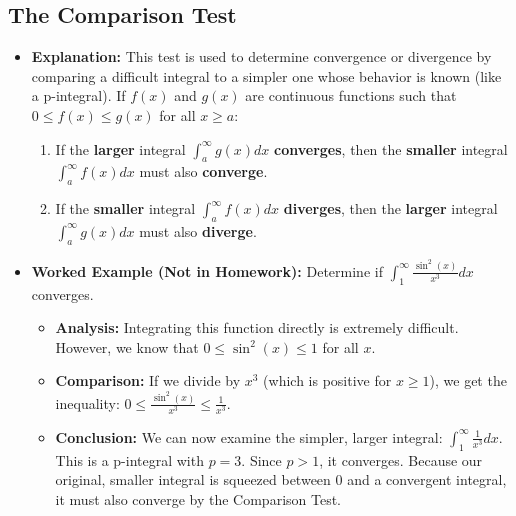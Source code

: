 \documentclass{article}
\begin{document}
\subsection{The Comparison Test}
\begin{itemize}
    \item \textbf{Explanation:} This test is used to determine convergence or divergence by comparing a difficult integral to a simpler one whose behavior is known (like a p-integral). If $f(x)$ and $g(x)$ are continuous functions such that $0 \le f(x) \le g(x)$ for all $x \ge a$:
    \begin{enumerate}
        \item If the \textbf{larger} integral $\int_a^\infty g(x) dx$ \textbf{converges}, then the \textbf{smaller} integral $\int_a^\infty f(x) dx$ must also \textbf{converge}.
        \item If the \textbf{smaller} integral $\int_a^\infty f(x) dx$ \textbf{diverges}, then the \textbf{larger} integral $\int_a^\infty g(x) dx$ must also \textbf{diverge}.
    \end{enumerate}
    \item \textbf{Worked Example (Not in Homework):} Determine if $\int_1^\infty \frac{\sin^2(x)}{x^3} dx$ converges.
    \begin{itemize}
        \item \textbf{Analysis:} Integrating this function directly is extremely difficult. However, we know that $0 \le \sin^2(x) \le 1$ for all $x$.
        \item \textbf{Comparison:} If we divide by $x^3$ (which is positive for $x \ge 1$), we get the inequality: $0 \le \frac{\sin^2(x)}{x^3} \le \frac{1}{x^3}$.
        \item \textbf{Conclusion:} We can now examine the simpler, larger integral: $\int_1^\infty \frac{1}{x^3} dx$. This is a p-integral with $p=3$. Since $p>1$, it converges. Because our original, smaller integral is squeezed between 0 and a convergent integral, it must also converge by the Comparison Test.
    \end{itemize}
\end{itemize}
\end{document}
